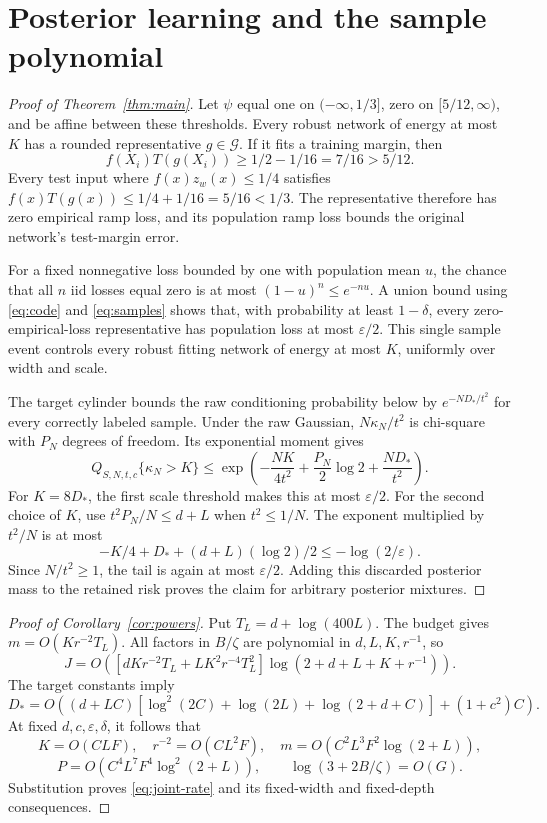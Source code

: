 \documentclass[11pt]{article}
\begin{document}
\section{Posterior learning and the sample polynomial}

\begin{proof}[Proof of Theorem~\ref{thm:main}]
Let $\psi$ equal one on $(-\infty,1/3]$, zero on $[5/12,\infty)$,
and be affine between these thresholds. Every robust network of energy
at most $K$ has a rounded representative $g\in\mathcal G$.
If it fits a training margin, then
\[
 f(X_i)T(g(X_i))\ge1/2-1/16=7/16>5/12.
\]
Every test input where $f(x)z_w(x)\le1/4$ satisfies
$f(x)T(g(x))\le1/4+1/16=5/16<1/3$.
The representative therefore has zero empirical ramp loss, and its
population ramp loss bounds the original network's test-margin error.

For a fixed nonnegative loss bounded by one with population mean $u$,
the chance that all $n$ iid losses equal zero is at most
$(1-u)^n\le e^{-nu}$. A union bound using \eqref{eq:code} and
\eqref{eq:samples} shows that, with probability at least $1-\delta$,
every zero-empirical-loss representative has population loss at most
$\varepsilon/2$. This single sample event controls every robust fitting
network of energy at most $K$, uniformly over width and scale.

The target cylinder bounds the raw conditioning probability below by
$e^{-ND_*/t^2}$ for every correctly labeled sample.
Under the raw Gaussian, $N\kappa_N/t^2$ is chi-square with $P_N$
degrees of freedom. Its exponential moment gives
\begin{equation}\label{eq:tail}
 Q_{S,N,t,c}\{\kappa_N>K\}
 \le\exp\!\left(-\frac{NK}{4t^2}
                  +\frac{P_N}{2}\log2+\frac{ND_*}{t^2}\right).
\end{equation}
For $K=8D_*$, the first scale threshold makes this at most
$\varepsilon/2$. For the second choice of $K$, use
$t^2P_N/N\le d+L$ when $t^2\le1/N$. The exponent multiplied by
$t^2/N$ is at most
\[
 -K/4+D_*+(d+L)(\log2)/2\le-\log(2/\varepsilon).
\]
Since $N/t^2\ge1$, the tail is again at most $\varepsilon/2$.
Adding this discarded posterior mass to the retained risk proves the
claim for arbitrary posterior mixtures.
\end{proof}

\begin{proof}[Proof of Corollary~\ref{cor:powers}]
Put $T_L=d+\log(400L)$. The budget gives
$m=O(Kr^{-2}T_L)$. All factors in $B/\zeta$ are polynomial in
$d,L,K,r^{-1}$, so
\[
 J=O\!\left(
 [dKr^{-2}T_L+LK^2r^{-4}T_L^2]
 \log(2+d+L+K+r^{-1})\right).
\]
The target constants imply
\[
 D_*=O\!\left((d+LC)
 [\log^2(2C)+\log(2L)+\log(2+d+C)]+(1+c^2)C\right).
\]
At fixed $d,c,\varepsilon,\delta$, it follows that
\[
 K=O(CLF),\quad r^{-2}=O(CL^2F),\quad
 m=O(C^2L^3F^2\log(2+L)),
\]
\[
 P=O(C^4L^7F^4\log^2(2+L)),\qquad
 \log(3+2B/\zeta)=O(G).
\]
Substitution proves \eqref{eq:joint-rate} and its fixed-width and
fixed-depth consequences.
\end{proof}
\end{document}
